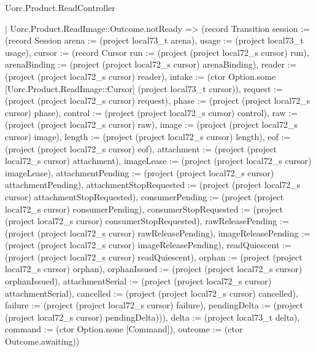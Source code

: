 \begin{lexlean}{Uorc.Product.ReadController}
\begin{semanticmodule}
{    | Uorc.Product.ReadImage::Outcome.notReady => (record Transition {session := (record Session {arena := (project local73_t arena), usage := (project local73_t usage), cursor := (record Cursor {run := (project (project local72_s cursor) run), arenaBinding := (project (project local72_s cursor) arenaBinding), reader := (project (project local72_s cursor) reader), intake := (ctor Option.some [Uorc.Product.ReadImage::Cursor] (project local73_t cursor)), request := (project (project local72_s cursor) request), phase := (project (project local72_s cursor) phase), control := (project (project local72_s cursor) control), raw := (project (project local72_s cursor) raw), image := (project (project local72_s cursor) image), length := (project (project local72_s cursor) length), eof := (project (project local72_s cursor) eof), attachment := (project (project local72_s cursor) attachment), imageLease := (project (project local72_s cursor) imageLease), attachmentPending := (project (project local72_s cursor) attachmentPending), attachmentStopRequested := (project (project local72_s cursor) attachmentStopRequested), consumerPending := (project (project local72_s cursor) consumerPending), consumerStopRequested := (project (project local72_s cursor) consumerStopRequested), rawReleasePending := (project (project local72_s cursor) rawReleasePending), imageReleasePending := (project (project local72_s cursor) imageReleasePending), readQuiescent := (project (project local72_s cursor) readQuiescent), orphan := (project (project local72_s cursor) orphan), orphanIssued := (project (project local72_s cursor) orphanIssued), attachmentSerial := (project (project local72_s cursor) attachmentSerial), cancelled := (project (project local72_s cursor) cancelled), failure := (project (project local72_s cursor) failure), pendingDelta := (project (project local72_s cursor) pendingDelta)})}), delta := (project local73_t delta), command := (ctor Option.none [Command]), outcome := (ctor Outcome.awaiting)})
}
\end{semanticmodule}
\end{lexlean}
